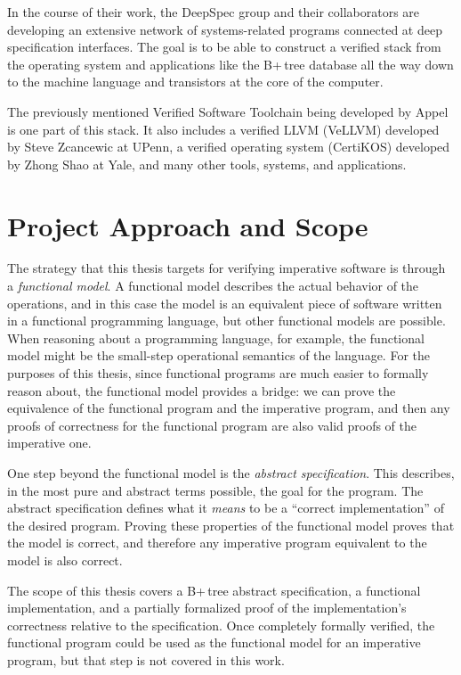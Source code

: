 \documentclass[a4paper,12pt]{article}
\begin{document}
In the course of their work, the DeepSpec group and their collaborators are developing an extensive network of systems-related programs connected at deep specification interfaces. The goal is to be able to construct a verified stack from the operating system and applications like the B+\,tree database all the way down to the machine language and transistors at the core of the computer.

The previously mentioned Verified Software Toolchain being developed by Appel is one part of this stack. It also includes a verified LLVM (VeLLVM) developed by Steve Zcancewic at UPenn, a verified operating system (CertiKOS) developed by Zhong Shao at Yale, and many other tools, systems, and applications.

\clearpage

\section{Project Approach and Scope}

The strategy that this thesis targets for verifying imperative software is through a \textit{functional model}. A functional model describes the actual behavior of the operations, and in this case the model is an equivalent piece of software written in a functional programming language, but other functional models are possible. When reasoning about a programming language, for example, the functional model might be the small-step operational semantics of the language. For the purposes of this thesis, since functional programs are much easier to formally reason about, the functional model provides a bridge: we can prove the equivalence of the functional program and the imperative program, and then any proofs of correctness for the functional program are also valid proofs of the imperative one.

One step beyond the functional model is the \textit{abstract specification}. This describes, in the most pure and abstract terms possible, the goal for the program. The abstract specification defines what it \textit{means} to be a “correct implementation” of the desired program. Proving these properties of the functional model proves that the model is correct, and therefore any imperative program equivalent to the model is also correct.

The scope of this thesis covers a B+\,tree abstract specification, a functional implementation, and a partially formalized proof of the implementation’s correctness relative to the specification. Once completely formally verified, the functional program could be used as the functional model for an imperative program, but that step is not covered in this work. 
\end{document}
